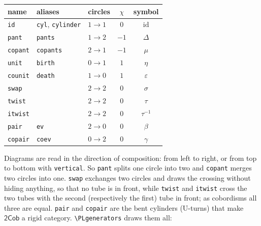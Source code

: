 \documentclass[11pt]{article}
\newenvironment{result}{\par\smallskip\noindent\hspace*{1em}}{\par\medskip}
\newcommand\opt[1]{\texttt{#1}}
\newcommand\cs[1]{\texttt{\textbackslash#1}}
\begin{document}
\begin{center}
\begin{tabular}{@{}lllcc@{}}
  \toprule
  name & aliases & circles & $\chi$ & symbol \\
  \midrule
  \opt{id}     & \opt{cyl}, \opt{cylinder} & $1\to1$ & $0$  & $\mathrm{id}$ \\
  \opt{pant}   & \opt{pants}              & $1\to2$ & $-1$ & $\Delta$ \\
  \opt{copant} & \opt{copants}            & $2\to1$ & $-1$ & $\mu$ \\
  \opt{unit}   & \opt{birth}              & $0\to1$ & $1$  & $\eta$ \\
  \opt{counit} & \opt{death}              & $1\to0$ & $1$  & $\varepsilon$ \\
  \opt{swap}   &                          & $2\to2$ & $0$  & $\sigma$ \\
  \opt{twist}  &                          & $2\to2$ & $0$  & $\tau$ \\
  \opt{itwist} &                          & $2\to2$ & $0$  & $\tau^{-1}$ \\
  \opt{pair}   & \opt{ev}                 & $2\to0$ & $0$  & $\beta$ \\
  \opt{copair} & \opt{coev}               & $0\to2$ & $0$  & $\gamma$ \\
  \bottomrule
\end{tabular}
\end{center}

Diagrams are read in the direction of composition: from left to right, or
from top to bottom with \opt{vertical}. So \opt{pant} splits one circle into
two and \opt{copant} merges two circles into one. \opt{swap} exchanges two
circles and draws the crossing without hiding anything, so that no tube is in
front, while \opt{twist} and \opt{itwist} cross the two tubes with the second
(respectively the first) tube in front; as cobordisms all three are equal.
\opt{pair} and \opt{copair} are the bent cylinders (U-turns) that make $\mathsf{2Cob}$ a rigid category.
\cs{PLgenerators} draws them all:

\begin{code}
\PLgenerators[names]
\PLgenerators*[vertical, names, list={pant, copant, unit, counit, twist, itwist}]
\end{code}
\begin{result}
  \PLgenerators[names]
\end{result}
\begin{result}
  \PLgenerators*[vertical, names, list={pant, copant, unit, counit, twist, itwist}]
\end{result}
\end{document}
